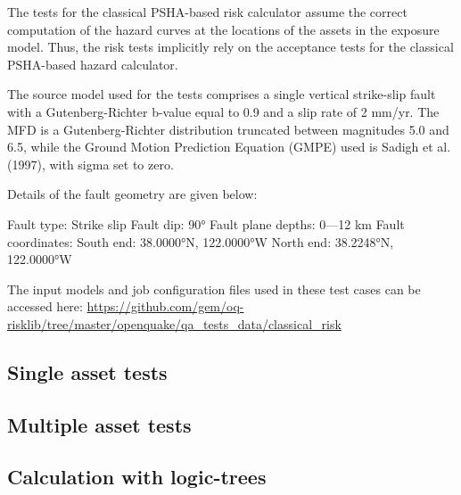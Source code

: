The tests for the classical PSHA-based risk calculator assume the correct computation of the hazard curves at the locations of the assets in the exposure model. Thus, the risk tests implicitly rely on the acceptance tests for the classical PSHA-based hazard calculator.

The source model used for the tests comprises a single vertical strike-slip fault with a Gutenberg-Richter b-value equal to 0.9 and a slip rate of 2 mm/yr. The MFD is a Gutenberg-Richter distribution truncated between magnitudes 5.0 and 6.5, while the Ground Motion Prediction Equation (GMPE) used is Sadigh et al. (1997), with sigma set to zero.

Details of the fault geometry are given below:

Fault type: Strike slip
Fault dip: 90°
Fault plane depths: 0—12 km
Fault coordinates:
South end: 38.0000°N, 122.0000°W
North end: 38.2248°N, 122.0000°W

The input models and job configuration files used in these test cases can be accessed here:
\href{https://github.com/gem/oq-risklib/tree/master/openquake/qa_tests_data/classical_risk}
{https://github.com/gem/oq-risklib/tree/master/openquake/qa_tests_data/classical_risk}

\subsection{Single asset tests}
\label{subsec:classical-single}

\subsection{Multiple asset tests}
\label{subsec:classical-multiple}

\subsection{Calculation with logic-trees}
\label{subsec:classical-logictrees}